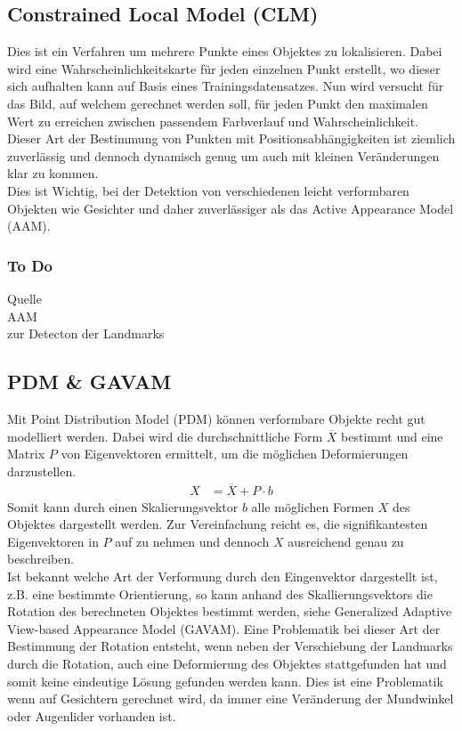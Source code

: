 \subsection{Constrained Local Model (CLM)}
Dies ist ein Verfahren um mehrere Punkte eines Objektes zu lokalisieren. Dabei wird eine Wahrscheinlichkeitskarte für jeden einzelnen Punkt erstellt, wo dieser sich aufhalten kann auf Basis eines Trainingsdatensatzes. Nun wird versucht für das Bild, auf welchem gerechnet werden soll, für jeden Punkt den maximalen Wert zu erreichen zwischen passendem Farbverlauf und Wahrscheinlichkeit.\\
Dieser Art der Bestimmung von Punkten mit Positionsabhängigkeiten ist ziemlich zuverlässig und dennoch dynamisch genug um auch mit kleinen Veränderungen klar zu kommen.\\
Dies ist Wichtig, bei der Detektion von verschiedenen leicht verformbaren Objekten wie Gesichter und daher zuverlässiger als das Active Appearance Model (AAM).
\subsubsection{To Do}
Quelle\\
AAM\\
zur Detecton der Landmarks
\subsection{PDM \& GAVAM}
Mit Point Distribution Model (PDM) können verformbare Objekte recht gut modelliert werden. Dabei wird die durchschnittliche Form $\overline{X}$ bestimmt und eine Matrix $P$ von Eigenvektoren ermittelt, um die möglichen Deformierungen darzustellen.
\begin{align*}
X &= \overline{X}+P\cdot b
\end{align*}
Somit kann durch einen Skalierungsvektor $b$ alle möglichen Formen $X$ des Objektes dargestellt werden. Zur Vereinfachung reicht es, die signifikantesten Eigenvektoren in $P$ auf zu nehmen und dennoch $X$ ausreichend genau zu beschreiben.\\
Ist bekannt welche Art der Verformung durch den Eingenvektor dargestellt ist, z.B. eine bestimmte Orientierung, so kann anhand des Skallierungsvektors die Rotation des berechneten Objektes bestimmt werden, siehe Generalized Adaptive View-based Appearance Model (GAVAM). Eine Problematik bei dieser Art der Bestimmung der Rotation entsteht, wenn neben der Verschiebung der Landmarks durch die Rotation, auch eine Deformierung des Objektes stattgefunden hat und somit keine eindeutige Lösung gefunden werden kann. Dies ist eine Problematik wenn auf Gesichtern gerechnet wird, da immer eine Veränderung der Mundwinkel oder Augenlider vorhanden ist.\\
\cite{wiki_PDM}\cite{pdf_PDM}\cite{pdf_GAVAM}